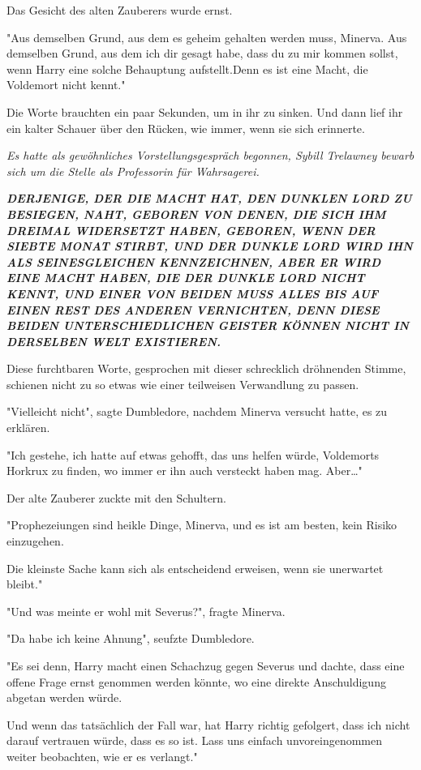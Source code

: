 {Das Gesicht des alten Zauberers wurde ernst.

"Aus demselben Grund, aus dem es geheim gehalten werden muss, Minerva. Aus demselben Grund, aus dem ich dir gesagt habe, dass du zu mir kommen sollst, wenn Harry eine solche Behauptung aufstellt.Denn es ist eine Macht, die Voldemort nicht kennt."

Die Worte brauchten ein paar Sekunden, um in ihr zu sinken. Und dann lief ihr ein kalter Schauer über den Rücken, wie immer, wenn sie sich erinnerte.

\emph{Es hatte als gewöhnliches Vorstellungsgespräch begonnen, Sybill Trelawney bewarb sich um die Stelle als Professorin für Wahrsagerei.}

\emph{\hfill\break }\textbf{\emph{DERJENIGE, DER DIE MACHT HAT, DEN DUNKLEN LORD ZU BESIEGEN, NAHT, GEBOREN VON DENEN, DIE SICH IHM DREIMAL WIDERSETZT HABEN, GEBOREN, WENN DER SIEBTE MONAT STIRBT, UND DER DUNKLE LORD WIRD IHN ALS SEINESGLEICHEN KENNZEICHNEN, ABER ER WIRD EINE MACHT HABEN, DIE DER DUNKLE LORD NICHT KENNT, UND EINER VON BEIDEN MUSS ALLES BIS AUF EINEN REST DES ANDEREN VERNICHTEN, DENN DIESE BEIDEN UNTERSCHIEDLICHEN GEISTER KÖNNEN NICHT IN DERSELBEN WELT EXISTIEREN.}}

Diese furchtbaren Worte, gesprochen mit dieser schrecklich dröhnenden Stimme, schienen nicht zu so etwas wie einer teilweisen Verwandlung zu passen.

"Vielleicht nicht", sagte Dumbledore, nachdem Minerva versucht hatte, es zu erklären.

"Ich gestehe, ich hatte auf etwas gehofft, das uns helfen würde, Voldemorts Horkrux zu finden, wo immer er ihn auch versteckt haben mag. Aber…"

Der alte Zauberer zuckte mit den Schultern.

"Prophezeiungen sind heikle Dinge, Minerva, und es ist am besten, kein Risiko einzugehen.

Die kleinste Sache kann sich als entscheidend erweisen, wenn sie unerwartet bleibt."

"Und was meinte er wohl mit Severus?", fragte Minerva.

"Da habe ich keine Ahnung", seufzte Dumbledore.

"Es sei denn, Harry macht einen Schachzug gegen Severus und dachte, dass eine offene Frage ernst genommen werden könnte, wo eine direkte Anschuldigung abgetan werden würde.

Und wenn das tatsächlich der Fall war, hat Harry richtig gefolgert, dass ich nicht darauf vertrauen würde, dass es so ist. Lass uns einfach unvoreingenommen weiter beobachten, wie er es verlangt."

}
